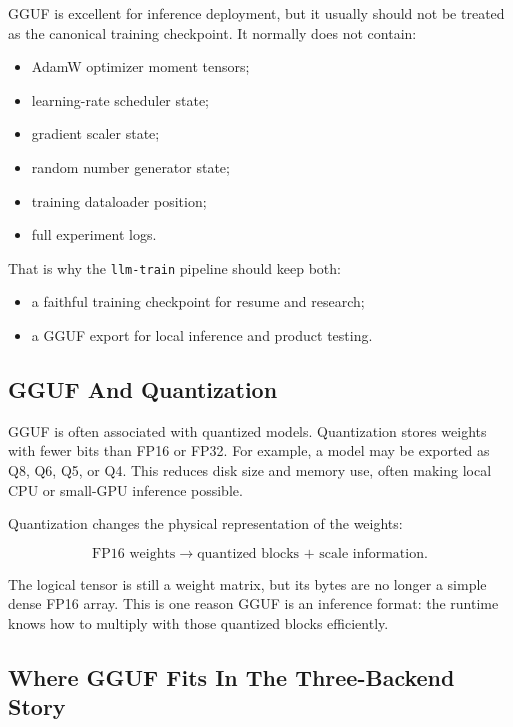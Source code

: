 GGUF is excellent for inference deployment, but it usually should not be treated as the
canonical training checkpoint. It normally does not contain:

\begin{itemize}
  \item AdamW optimizer moment tensors;
  \item learning-rate scheduler state;
  \item gradient scaler state;
  \item random number generator state;
  \item training dataloader position;
  \item full experiment logs.
\end{itemize}

That is why the \texttt{llm-train} pipeline should keep both:

\begin{itemize}
  \item a faithful training checkpoint for resume and research;
  \item a GGUF export for local inference and product testing.
\end{itemize}

\subsection{GGUF And Quantization}

GGUF is often associated with quantized models. Quantization stores weights with fewer
bits than FP16 or FP32. For example, a model may be exported as Q8, Q6, Q5, or Q4. This
reduces disk size and memory use, often making local CPU or small-GPU inference possible.

Quantization changes the physical representation of the weights:

\[
\text{FP16 weights} \rightarrow \text{quantized blocks + scale information}.
\]

The logical tensor is still a weight matrix, but its bytes are no longer a simple dense
FP16 array. This is one reason GGUF is an inference format: the runtime knows how to
multiply with those quantized blocks efficiently.

\subsection{Where GGUF Fits In The Three-Backend Story}

